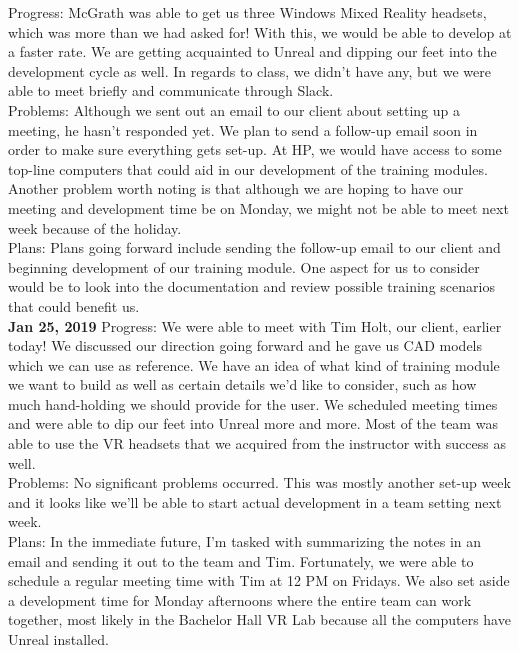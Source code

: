 Progress: 	McGrath was able to get us three Windows Mixed Reality headsets, which was more than we had asked for! With this, we would be able to develop at a faster rate. We are getting acquainted to Unreal and dipping our feet into the development cycle as well. In regards to class, we didn't have any, but we were able to meet briefly and communicate through Slack.\\
Problems: 	Although we sent out an email to our client about setting up a meeting, he hasn't responded yet. We plan to send a follow-up email soon in order to make sure everything gets set-up. At HP, we would have access to some top-line computers that could aid in our development of the training modules. Another problem worth noting is that although we are hoping to have our meeting and development time be on Monday, we might not be able to meet next week because of the holiday.\\
Plans: 	Plans going forward include sending the follow-up email to our client and beginning development of our training module. One aspect for us to consider would be to look into the documentation and review possible training scenarios that could benefit us.\\
\textbf{Jan 25, 2019}
Progress: 	We were able to meet with Tim Holt, our client, earlier today! We discussed our direction going forward and he gave us CAD models which we can use as reference. We have an idea of what kind of training module we want to build as well as certain details we'd like to consider, such as how much hand-holding we should provide for the user. We scheduled meeting times and were able to dip our feet into Unreal more and more. Most of the team was able to use the VR headsets that we acquired from the instructor with success as well.\\
Problems: 	No significant problems occurred. This was mostly another set-up week and it looks like we'll be able to start actual development in a team setting next week. \\
Plans: 	In the immediate future, I'm tasked with summarizing the notes in an email and sending it out to the team and Tim. Fortunately, we were able to schedule a regular meeting time with Tim at 12 PM on Fridays. We also set aside a development time for Monday afternoons where the entire team can work together, most likely in the Bachelor Hall VR Lab because all the computers have Unreal installed. \\

